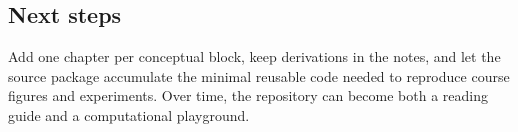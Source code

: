 \subsection{Next steps}

Add one chapter per conceptual block, keep derivations in the notes, and let the source package accumulate the minimal reusable code needed to reproduce course figures and experiments. Over time, the repository can become both a reading guide and a computational playground.

